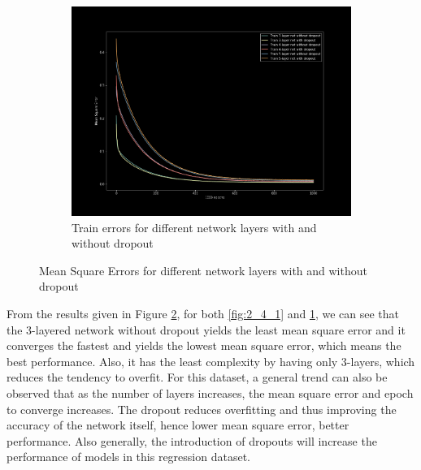 \begin{figure}[H]
    \ContinuedFloat
    \begin{subfigure}{1\textwidth}
        \centering
        \includegraphics[width=0.8\linewidth]{assets/plots2/part4_2.png}
        \caption{Train errors for different network layers with and without dropout}
        \label{fig:2_4_2}
    \end{subfigure}
    \caption{Mean Square Errors for different network layers with and without dropout}
    \label{fig:2_4_3}
\end{figure}

From the results given in Figure \ref{fig:2_4_3}, for both \ref{fig:2_4_1} and \ref{fig:2_4_2}, we can see that the 3-layered network without dropout yields the least mean square error and it converges the fastest and yields the lowest mean square error, which means the best performance. Also, it has the least complexity by having only 3-layers, which reduces the tendency to overfit. For this dataset, a general trend can also be observed that as the number of layers increases, the mean square error and epoch to converge increases. The dropout reduces overfitting and thus improving the accuracy of the network itself, hence lower mean square error, better performance. Also generally, the introduction of dropouts will increase the performance of models in this regression dataset.

